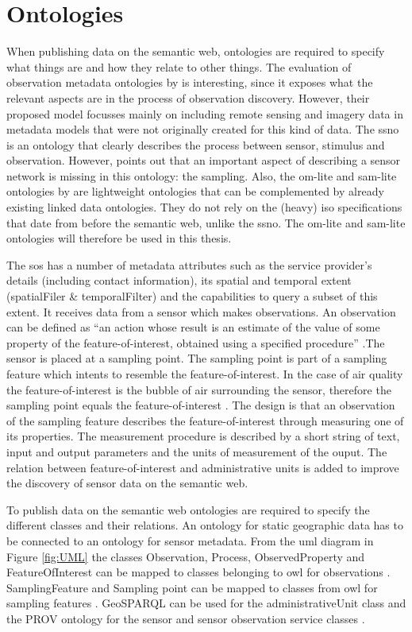 \section{Ontologies}
When publishing data on the semantic web, ontologies are required to specify what things are and how they relate to other things. The evaluation of observation metadata ontologies by \cite{SW:Hu} is interesting, since it exposes what the relevant aspects are in the process of observation discovery. However, their proposed model focusses mainly on including remote sensing and imagery data in metadata models that were not originally created for this kind of data. The \ac{ssno} is an ontology that clearly describes the process between sensor, stimulus and observation. However, \cite{SSW:Cox4} points out that an important aspect of describing a sensor network is missing in this ontology: the sampling. Also, the om-lite and sam-lite ontologies by \cite{SSW:Cox4} are lightweight ontologies that can be complemented by already existing linked data ontologies. They do not rely on the (heavy) \ac{iso} specifications that date from before the semantic web, unlike the \ac{ssno}. The om-lite and sam-lite ontologies will therefore be used in this thesis. 

 The \ac{sos} has a number of metadata attributes such as the service provider's details (including contact information), its spatial and temporal extent (spatialFiler \& temporalFilter) and the capabilities to query a subset of this extent. It receives data from a sensor which makes observations. An observation can be defined as \enquote{an action whose result is an estimate of the value of some property of the feature-of-interest, obtained using a specified procedure} \citep{SSW:Cox3}.The sensor is placed at a sampling point. The sampling point is part of a sampling feature which intents to resemble the feature-of-interest. In the case of air quality the feature-of-interest is the bubble of air surrounding the sensor, therefore the sampling point equals the feature-of-interest \citep{SDI:INSPIRE2}. The design is that an observation of the sampling feature describes the  feature-of-interest through measuring one of its properties. The measurement procedure is described by a short string of text, input and output parameters and the units of measurement of the ouput. The relation between feature-of-interest and administrative units is added to improve the discovery of sensor data on the semantic web. 

To publish data on the semantic web ontologies are required to specify the different classes and their relations. An ontology for static geographic data has to be connected to an ontology for sensor metadata. From the \ac{uml} diagram in Figure \ref{fig:UML} the classes Observation, Process, ObservedProperty and FeatureOfInterest can be mapped to classes belonging to \ac{owl} for observations \citep{SSW:Cox}. SamplingFeature and Sampling point can be mapped to classes from \ac{owl} for sampling features \citep{SSW:Cox2}. GeoSPARQL can be used for the administrativeUnit class \citep{LD:OGC} and the PROV ontology for the sensor and sensor observation service classes \citep{LD:W3C2}. 

